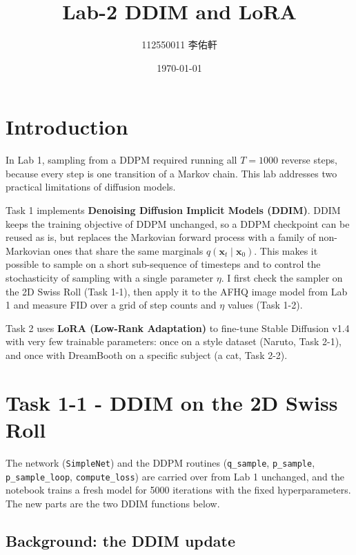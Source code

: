 \documentclass[a4paper]{article} %
\title{Lab-2 DDIM and LoRA}
\author{112550011 李佑軒}
\date{\today}
\begin{document}
\maketitle %

\section{Introduction}

In Lab 1, sampling from a DDPM required running all $T=1000$ reverse steps, because every step is
one transition of a Markov chain. This lab addresses two practical limitations of diffusion models.

Task 1 implements \textbf{Denoising Diffusion Implicit Models (DDIM)}. DDIM keeps the training
objective of DDPM unchanged, so a DDPM checkpoint can be reused as is, but replaces the Markovian
forward process with a family of non-Markovian ones that share the same marginals
$q(\mathbf{x}_t\mid\mathbf{x}_0)$. This makes it possible to sample on a short sub-sequence of
timesteps and to control the stochasticity of sampling with a single parameter $\eta$. I first
check the sampler on the 2D Swiss Roll (Task 1-1), then apply it to the AFHQ image model from Lab 1
and measure FID over a grid of step counts and $\eta$ values (Task 1-2).

Task 2 uses \textbf{LoRA (Low-Rank Adaptation)} to fine-tune Stable Diffusion v1.4 with very few
trainable parameters: once on a style dataset (Naruto, Task 2-1), and once with DreamBooth on a
specific subject (a cat, Task 2-2).


\section{Task 1-1 - DDIM on the 2D Swiss Roll}

The network (\texttt{SimpleNet}) and the DDPM routines (\texttt{q\_sample}, \texttt{p\_sample},
\texttt{p\_sample\_loop}, \texttt{compute\_loss}) are carried over from Lab 1 unchanged, and the
notebook trains a fresh model for 5000 iterations with the fixed hyperparameters. The new parts are
the two DDIM functions below.

\subsection{Background: the DDIM update}
\end{document}
